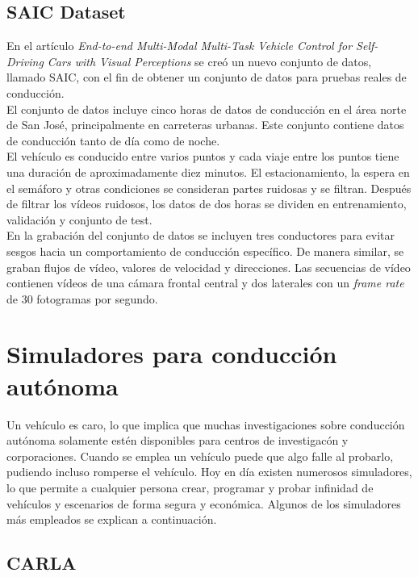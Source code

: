 \subsection{SAIC Dataset}

En el artículo \textit{End-to-end Multi-Modal Multi-Task Vehicle Control for Self-Driving Cars with Visual Perceptions} \cite{multi-modal} se creó un nuevo conjunto de datos, llamado SAIC, con el fin de obtener un conjunto de datos para pruebas reales de conducción.\\

El conjunto de datos incluye cinco horas de datos de conducción en el área norte de San José, principalmente en carreteras urbanas. Este conjunto contiene datos de conducción tanto de día como de noche. \\

El vehículo es conducido entre varios puntos y cada viaje entre los puntos tiene una duración de aproximadamente diez minutos. El estacionamiento, la espera en el semáforo y otras condiciones se consideran partes ruidosas y se filtran. Después de filtrar los vídeos ruidosos, los datos de dos horas se dividen en entrenamiento, validación y conjunto de test.\\

En la grabación del conjunto de datos se incluyen tres conductores para evitar sesgos hacia un comportamiento de conducción específico. De manera similar, se graban flujos de vídeo, valores de velocidad y direcciones. Las secuencias de vídeo contienen vídeos de una cámara frontal central y dos laterales con un \textit{frame rate} de 30 fotogramas por segundo.



\section{Simuladores para conducción autónoma}

Un vehículo es caro, lo que implica que muchas investigaciones sobre conducción autónoma solamente estén disponibles para centros de investigacón y corporaciones. Cuando se emplea un vehículo puede que algo falle al probarlo, pudiendo incluso romperse el vehículo. Hoy en día existen numerosos simuladores, lo que permite a cualquier persona crear, programar y probar infinidad de vehículos y escenarios de forma segura y económica. Algunos de los simuladores más empleados se explican a continuación.

\subsection{CARLA}

